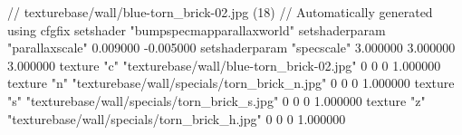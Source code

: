 // texturebase/wall/blue-torn_brick-02.jpg (18)
// Automatically generated using cfgfix
setshader "bumpspecmapparallaxworld"
setshaderparam "parallaxscale" 0.009000 -0.005000
setshaderparam "specscale" 3.000000 3.000000 3.000000
texture "c" "texturebase/wall/blue-torn_brick-02.jpg" 0 0 0 1.000000
texture "n" "texturebase/wall/specials/torn_brick_n.jpg" 0 0 0 1.000000
texture "s" "texturebase/wall/specials/torn_brick_s.jpg" 0 0 0 1.000000
texture "z" "texturebase/wall/specials/torn_brick_h.jpg" 0 0 0 1.000000
